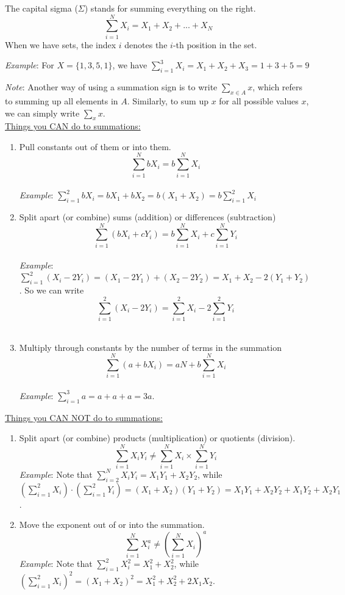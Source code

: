 \documentclass{./../../Latex/handout}
\begin{document}
\thispagestyle{plain}

The capital sigma ($\Sigma$) stands for summing everything on the right. 
$$ \sum_{i=1}^N X_i = X_1 + X_2 + ... + X_N $$
When we have sets, the index $i$ denotes the $i$-th position in the set. 

\textit{Example}: For $X = \{1, 3, 5, 1\}$, we have $\sum_{i=1}^3 X_i = X_1 + X_2 + X_3 = 1 + 3 + 5 = 9$

\textit{Note}: Another way of using a summation sign is to write $\sum_{x \in A} x $, which refers to summing up all elements in $A$. Similarly, to sum up $x$ for all possible values $x$, we can simply write $\sum_x x$. \\


\underline{Things you CAN do to summations:}
\begin{enumerate}
\item Pull constants out of them or into them.
$$ \sum_{i=1}^N b X_i = b \sum_{i=1}^N X_i  $$ \\
\textit{Example}: $ \sum_{i=1}^2 b X_i = b X_1 + b X_2 = b(X_1 + X_2) = b \sum_{i=1}^2 X_i $ \\
\item Split apart (or combine) sums (addition) or differences (subtraction)
$$ \sum_{i=1}^N (b X_i + c Y_i) = b \sum_{i=1}^N X_i  + c \sum_{i=1}^N Y_i $$ \\
\textit{Example}: $\sum_{i=1}^2 (X_i - 2 Y_i) = (X_1-2 Y_1) + (X_2-2 Y_2) = X_1 + X_2 - 2(Y_1 + Y_2)$. So we can write $$\sum_{i=1}^2 (X_i - 2 Y_i) = \sum_{i=1}^2 X_i - 2 \sum_{i=1}^2 Y_i $$ \\
\item Multiply through constants by the number of terms in the summation
$$ \sum_{i=1}^N (a+b X_i)= aN + b \sum_{i=1}^N X_i  $$ \\
\textit{Example}: $\sum_{i=1}^3 a = a + a + a = 3a $. \\
\end{enumerate}

\underline{Things you CAN NOT do to summations:}
\begin{enumerate}
\item Split apart (or combine) products (multiplication) or quotients (division).
$$ \sum_{i=1}^N X_i Y_i \neq  \sum_{i=1}^N X_i \times \sum_{i=1}^N Y_i   $$
\textit{Example}: Note that $\sum_{i=2}^N X_i Y_i = X_1 Y_1 + X_2 Y_2 $, while $(\sum_{i=1}^2 X_i) \cdot (\sum_{i=1}^2 Y_i) = (X_1+X_2)(Y_1 + Y_2) = X_1 Y_1 + X_2 Y_2 + X_1 Y_2 + X_2 Y_1 $. \\

\item Move the exponent out of or into the summation.
$$ \sum_{i=1}^N X_i^a \neq  \left(\sum_{i=1}^N X_i\right)^a $$
\textit{Example}: Note that $\sum_{i=1}^2 X_i^2 =  X_1^2 + X_2 ^2$, while  $\left(\sum_{i=1}^2 X_i\right)^2 = (X_1 + X_2)^2 = X_1^2 + X_2 ^2 + 2X_1 X_2$. \\
\end{enumerate}
\end{document}
